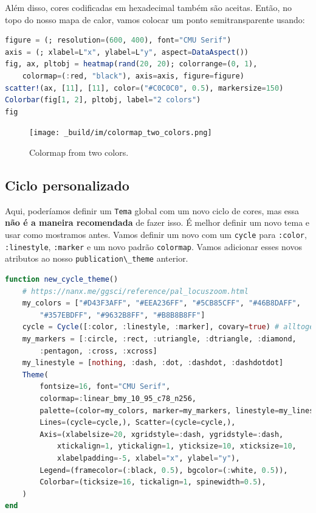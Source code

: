 \documentclass[
  notoc %
]{tufte-book}
\newcommand{\passthrough}[1]{#1}
\begin{document}
Além disso, cores codificadas em hexadecimal também são aceitas. Então,
no topo do nosso mapa de calor, vamos colocar um ponto semitransparente
usando:

\begin{lstlisting}[language=Julia]
figure = (; resolution=(600, 400), font="CMU Serif")
axis = (; xlabel=L"x", ylabel=L"y", aspect=DataAspect())
fig, ax, pltobj = heatmap(rand(20, 20); colorrange=(0, 1),
    colormap=(:red, "black"), axis=axis, figure=figure)
scatter!(ax, [11], [11], color=("#C0C0C0", 0.5), markersize=150)
Colorbar(fig[1, 2], pltobj, label="2 colors")
fig
\end{lstlisting}

\begin{figure}
\hypertarget{fig:colormap_two_colors}{%
\centering
\texttt{[image: \_build/im/colormap\_two\_colors.png]}
\caption{Colormap from two colors.}\label{fig:colormap_two_colors}
}
\end{figure}

\hypertarget{ciclo-personalizado}{%
\subsection{Ciclo personalizado}\label{ciclo-personalizado}}

Aqui, poderíamos definir um \passthrough{\lstinline!Tema!} global com um
novo ciclo de cores, mas essa \textbf{não é a maneira recomendada} de
fazer isso. É melhor definir um novo tema e usar como mostramos antes.
Vamos definir um novo com um \passthrough{\lstinline!cycle!} para
\passthrough{\lstinline!:color!}, \passthrough{\lstinline!:linestyle!},
\passthrough{\lstinline!:marker!} e um novo padrão
\passthrough{\lstinline!colormap!}. Vamos adicionar esses novos
atributos ao nosso \passthrough{\lstinline!publication\_theme!}
anterior.

\begin{lstlisting}[language=Julia]
function new_cycle_theme()
    # https://nanx.me/ggsci/reference/pal_locuszoom.html
    my_colors = ["#D43F3AFF", "#EEA236FF", "#5CB85CFF", "#46B8DAFF",
        "#357EBDFF", "#9632B8FF", "#B8B8B8FF"]
    cycle = Cycle([:color, :linestyle, :marker], covary=true) # alltogether
    my_markers = [:circle, :rect, :utriangle, :dtriangle, :diamond,
        :pentagon, :cross, :xcross]
    my_linestyle = [nothing, :dash, :dot, :dashdot, :dashdotdot]
    Theme(
        fontsize=16, font="CMU Serif",
        colormap=:linear_bmy_10_95_c78_n256,
        palette=(color=my_colors, marker=my_markers, linestyle=my_linestyle),
        Lines=(cycle=cycle,), Scatter=(cycle=cycle,),
        Axis=(xlabelsize=20, xgridstyle=:dash, ygridstyle=:dash,
            xtickalign=1, ytickalign=1, yticksize=10, xticksize=10,
            xlabelpadding=-5, xlabel="x", ylabel="y"),
        Legend=(framecolor=(:black, 0.5), bgcolor=(:white, 0.5)),
        Colorbar=(ticksize=16, tickalign=1, spinewidth=0.5),
    )
end
\end{lstlisting}
\end{document}
